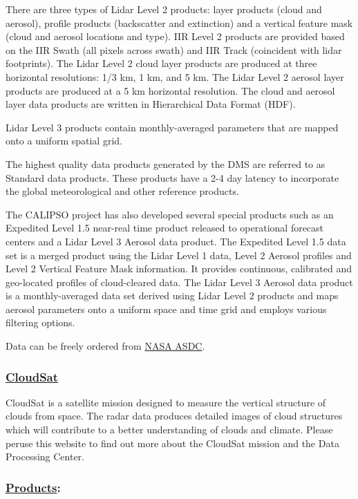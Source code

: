 \documentclass[11pt]{article}
\begin{document}
There are three types of Lidar Level 2 products: layer products
(cloud and aerosol), profile products (backscatter and extinction)
and a vertical feature mask (cloud and aerosol locations and
type). IIR Level 2 products are provided based on the IIR Swath
(all pixels across swath) and IIR Track (coincident with lidar
footprints). The Lidar Level 2 cloud layer products are produced
at three horizontal resolutions: 1/3 km, 1 km, and 5 km. The Lidar
Level 2 aerosol layer products are produced at a 5 km horizontal
resolution. The cloud and aerosol layer data products are written
in Hierarchical Data Format (HDF).

Lidar Level 3 products contain monthly-averaged parameters that
are mapped onto a uniform spatial grid.

The highest quality data products generated by the DMS are
referred to as Standard data products. These products have a 2-4
day latency to incorporate the global meteorological and other
reference products. 

The CALIPSO project has also developed several special products
such as an Expedited Level 1.5 near-real time product released to
operational forecast centers and a Lidar Level 3 Aerosol data
product. The Expedited Level 1.5 data set is a merged product
using the Lidar Level 1 data, Level 2 Aerosol profiles and Level 2
Vertical Feature Mask information. It provides continuous,
calibrated and geo-located profiles of cloud-cleared data. The
Lidar Level 3 Aerosol data product is a monthly-averaged data set
derived using Lidar Level 2 products and maps aerosol parameters
onto a uniform space and time grid and employs various filtering
options.

Data can be freely ordered from \href{http://eosweb.larc.nasa.gov/HBDOCS/langley_web_tool.html}{NASA ASDC}.
\subsubsection{\href{http://cloudsat.atmos.colostate.edu/}{CloudSat}}
\label{sec-1-5-2}

CloudSat is a satellite mission designed to measure the vertical
structure of clouds from space. The radar data produces detailed
images of cloud structures which will contribute to a better
understanding of clouds and climate. Please peruse this website to
find out more about the CloudSat mission and the Data Processing
Center.  
\subsubsection{\href{http://www.cloudsat.cira.colostate.edu/dataHome.php}{Products}:}
\label{sec-1-5-3}
\end{document}
